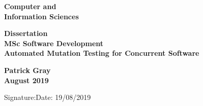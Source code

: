 \documentclass[a4paper,12pt]{article}
\begin{document}
\pagestyle{empty}                       %
\begin{minipage}[b]{110mm}
        {\Huge\bf Computer and \\Information Sciences
        \vspace*{17mm}}
\end{minipage}
\hfill
\begin{minipage}[t]{40mm}               
\end{minipage}
\par\noindent                                           %
\vspace*{0cm}
\begin{center}
        \Large\bf \Large\bf Dissertation\\
        \Large\bf MSc Software Development\\[10pt]                     %
        \LARGE\bf Automated Mutation Testing for Concurrent Software         %
\end{center}
\vspace*{0cm}
\begin{center}
        \bf Patrick Gray\\                           %
        August 2019                                    %
\end{center}
\vspace*{5mm}
%
%                       
\begin{abstract}

\end{abstract}
\vspace*{2cm}
Signature:\hspace*{8cm}Date: 19/08/2019
\end{document}
